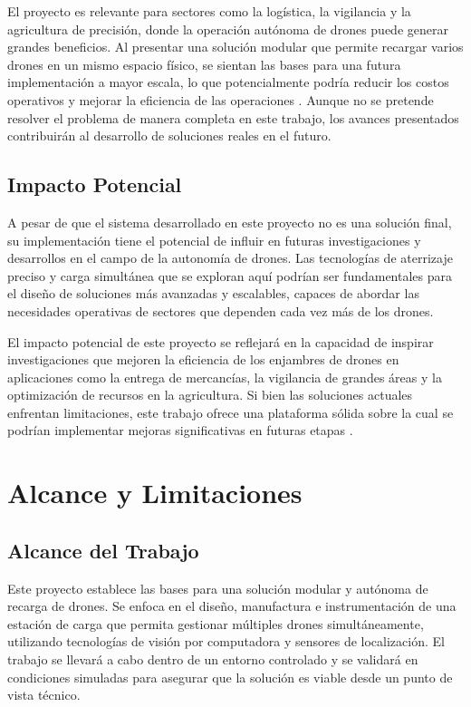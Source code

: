 El proyecto es relevante para sectores como la logística, la vigilancia y la agricultura de precisión, donde la operación autónoma de drones puede generar grandes beneficios. Al presentar una solución modular que permite recargar varios drones en un mismo espacio físico, se sientan las bases para una futura implementación a mayor escala, lo que potencialmente podría reducir los costos operativos y mejorar la eficiencia de las operaciones \cite{cite1}. Aunque no se pretende resolver el problema de manera completa en este trabajo, los avances presentados contribuirán al desarrollo de soluciones reales en el futuro.

\subsection{Impacto Potencial}

A pesar de que el sistema desarrollado en este proyecto no es una solución final, su implementación tiene el potencial de influir en futuras investigaciones y desarrollos en el campo de la autonomía de drones. Las tecnologías de aterrizaje preciso y carga simultánea que se exploran aquí podrían ser fundamentales para el diseño de soluciones más avanzadas y escalables, capaces de abordar las necesidades operativas de sectores que dependen cada vez más de los drones.

El impacto potencial de este proyecto se reflejará en la capacidad de inspirar investigaciones que mejoren la eficiencia de los enjambres de drones en aplicaciones como la entrega de mercancías, la vigilancia de grandes áreas y la optimización de recursos en la agricultura. Si bien las soluciones actuales enfrentan limitaciones, este trabajo ofrece una plataforma sólida sobre la cual se podrían implementar mejoras significativas en futuras etapas \cite{cite2}.

\section{Alcance y Limitaciones}

\subsection{Alcance del Trabajo}

Este proyecto establece las bases para una solución modular y autónoma de recarga de drones. Se enfoca en el diseño, manufactura e instrumentación de una estación de carga que permita gestionar múltiples drones simultáneamente, utilizando tecnologías de visión por computadora y sensores de localización. El trabajo se llevará a cabo dentro de un entorno controlado y se validará en condiciones simuladas para asegurar que la solución es viable desde un punto de vista técnico.


